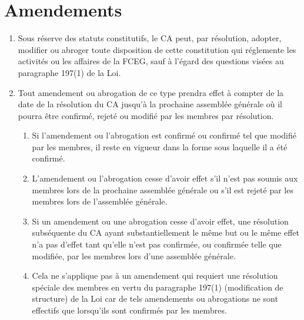\section{Amendements}
\label{amendements}

\begin{enumerate}
 \item Sous réserve des statuts constitutifs, le CA peut, par résolution, adopter, modifier ou abroger toute disposition de cette constitution qui réglemente les activités ou les affaires de la FCEG, sauf à l'égard des questions visées au paragraphe 197(1) de la Loi.
 \item Tout amendement ou abrogation de ce type prendra effet à compter de la date de la résolution du CA jusqu'à la prochaine assemblée générale où il pourra être confirmé, rejeté ou modifié par les membres par résolution.
  \begin{enumerate}
   \item Si l'amendement ou l'abrogation est confirmé ou confirmé tel que modifié par les membres, il reste en vigueur dans la forme sous laquelle il a été confirmé.
   \item L'amendement ou l'abrogation cesse d'avoir effet s'il n'est pas soumis aux membres lors de la prochaine assemblée générale ou s'il est rejeté par les membres lors de l'assemblée générale.
   \item Si un amendement ou une abrogation cesse d'avoir effet, une résolution subséquente du CA ayant substantiellement le même but ou le même effet n'a pas d'effet tant qu'elle n'est pas confirmée, ou confirmée telle que modifiée, par les membres lors d'une assemblée générale.
   \item Cela ne s'applique pas à un amendement qui requiert une résolution spéciale des membres en vertu du paragraphe 197(1) (modification de structure) de la Loi car de tels amendements ou abrogations ne sont effectifs que lorsqu'ils sont confirmés par les membres.
  \end{enumerate}
\end{enumerate}

